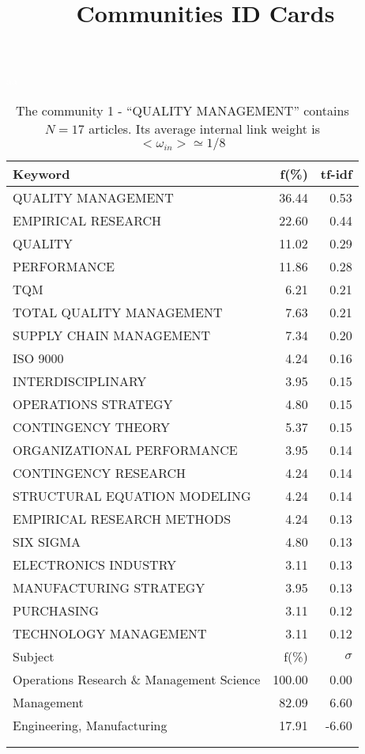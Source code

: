 \documentclass[a4paper,11pt]{report}
\title{{\bf Communities ID Cards}}
\date{\begin{flushleft}This document gather the ``ID Cards'' of the CC communities found within your database.\\
 The CC network was built by keeping a link between articles sharing at least 5 references. The communities characterized here correspond to the ones found in the level 1 (in the sense of the Louvain algo) which gathers more than 0 articles.\\
 These ID cards displays the most frequent keywords, subject categories, journals of publication, institution, countries, authors, references and reference journals of the articles of each community. The significance of an item $\sigma = \sqrt{N} (f - p) / \sqrt{p(1-p)}$ [where $N$ is the number of articles within the community and $f$ and $p$ are the proportion of articles respectively within the community and within the database displaying that item ] is also given (for example $\sigma > 5$ is really highly significant). The tf-idf value which can be calculated by $tf-idf = f*log(1/p)$ is also given.\\
\vspace{1cm}
\copyright Sebastian Grauwin, Liu Weizhi - (2014) \end{flushleft}}
\begin{document}
\begin{landscape}
\maketitle
\clearpage

\begin{table}[!ht]
\caption{The community 1 - ``QUALITY MANAGEMENT'' contains $N = 17$ articles. Its average internal link weight is $<\omega_{in}> \simeq 1/8$ }
\textcolor{white}{aa}\\
{\scriptsize\begin{tabular}{|l r  r|}
\hline
Keyword & f(\%) & tf-idf \\
\hline
QUALITY MANAGEMENT & 36.44 & 0.53\\
EMPIRICAL RESEARCH & 22.60 & 0.44\\
QUALITY & 11.02 & 0.29\\
PERFORMANCE & 11.86 & 0.28\\
TQM & 6.21 & 0.21\\
TOTAL QUALITY MANAGEMENT & 7.63 & 0.21\\
SUPPLY CHAIN MANAGEMENT & 7.34 & 0.20\\
ISO 9000 & 4.24 & 0.16\\
INTERDISCIPLINARY & 3.95 & 0.15\\
OPERATIONS STRATEGY & 4.80 & 0.15\\
CONTINGENCY THEORY & 5.37 & 0.15\\
ORGANIZATIONAL PERFORMANCE & 3.95 & 0.14\\
CONTINGENCY RESEARCH & 4.24 & 0.14\\
STRUCTURAL EQUATION MODELING & 4.24 & 0.14\\
EMPIRICAL RESEARCH METHODS & 4.24 & 0.13\\
SIX SIGMA & 4.80 & 0.13\\
ELECTRONICS INDUSTRY & 3.11 & 0.13\\
MANUFACTURING STRATEGY & 3.95 & 0.13\\
PURCHASING & 3.11 & 0.12\\
TECHNOLOGY MANAGEMENT & 3.11 & 0.12\\
\hline
\hline
Subject & f(\%) & $\sigma$\\
\hline
Operations Research \& Management Science & 100.00 & 0.00\\
Management & 82.09 & 6.60\\
Engineering, Manufacturing & 17.91 & -6.60\\
 &  & \\
 &  & \\

\end{tabular}}
\end{table}
\end{landscape}
\end{document}

